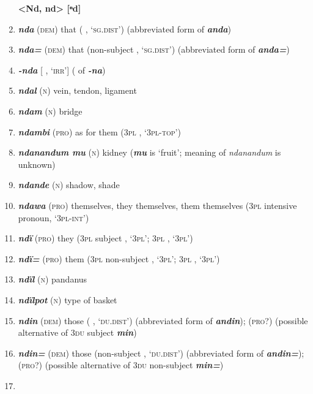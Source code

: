 \begin{enumerate}[noitemsep, label={}, align=left, widest=190, labelsep=1ex,leftmargin=*,itemindent=-10pt]
\noindent \textbf{<Nd, nd>      [ⁿd]}\\ \item 

\textbf{\textit{nda}} (\textsc{dem}) that (  , ‘\textsc{sg.dist}’) (abbreviated form of \textbf{\textit{anda}}) \item 
\textbf{\textit{nda=}} (\textsc{dem}) that (non-subject   , ‘\textsc{sg.dist}’) \linebreak (abbreviated form of \textbf{\textit{anda=}}) \item 
\textbf{\textit{-nda}} [ , ‘\textsc{irr}’] ( of \textbf{\textit{-na}}) \item 
\textbf{\textit{ndal}} (\textsc{n}) vein, tendon, ligament \item 
\textbf{\textit{ndam}} (\textsc{n}) bridge \item 
\textbf{\textit{ndambi}} (\textsc{pro}) as for them (\textsc{3pl} , ‘\textsc{3pl-top}’) \item 
\textbf{\textit{ndanandum mu}} (\textsc{n}) kidney (\textbf{\textit{mu}} is ‘fruit’; meaning of \textit{ndanandum} is unknown) \item 
\textbf{\textit{ndande}} (\textsc{n}) shadow, shade \item 
\textbf{\textit{ndawa}} (\textsc{pro}) themselves, they themselves, them themselves (\textsc{3pl} intensive \linebreak pronoun, ‘\textsc{3pl-int}’) \item 
\textbf{\textit{ndï}} (\textsc{pro}) they (\textsc{3pl} subject , ‘\textsc{3pl}’; \textsc{3pl} , ‘\textsc{3pl}’) \item 
\textbf{\textit{ndï=}} (\textsc{pro}) them (\textsc{3pl} non-subject , ‘\textsc{3pl}’; \textsc{3pl} , ‘\textsc{3pl}’) \item 
\textbf{\textit{ndïl}} (\textsc{n}) pandanus \item 
\textbf{\textit{ndïlpot}} (\textsc{n}) type of basket \item 
\textbf{\textit{ndin}} (\textsc{dem}) those (  , ‘\textsc{du.dist}’) (abbreviated form of \textbf{\textit{andin}}); (\textsc{pro?}) (possible alternative of \textsc{3du} subject  \textbf{\textit{min}}) \item 
\textbf{\textit{ndin=}} (\textsc{dem}) those (non-subject   , ‘\textsc{du.dist}’) \linebreak (abbreviated form of \textbf{\textit{andin=}}); (\textsc{pro?}) (possible alternative of \textsc{3du} non-subject  \textbf{\textit{min=}}) \item 

\end{enumerate}
